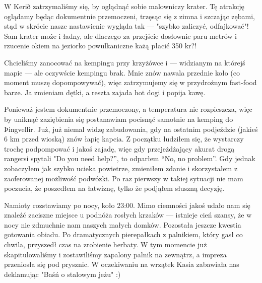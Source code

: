 
W Kerið zatrzymaliśmy się, by oglądnąć sobie malowniczy krater. Tę atrakcję oglądamy będąc dokumentnie przemoczeni, trzęsąc się z zimna i szczając zębami, stąd w skrócie nasze nastawienie wygląda tak --- "szybko zaliczyć, odfajkować"! Sam krater może i ładny, ale dlaczego za przejście dosłownie paru metrów i rzucenie okiem na jeziorko powulkaniczne każą płacić 350 kr?!

Chcieliśmy zanocować na kempingu przy krzyżówce  i  --- widzianym na którejś mapie --- ale oczywście kempingu brak. Mnie znów nawala przednie koło (co moment muszę dopompowywać), więc zatrzymujemy się w przydrożnym fast-food barze. Ja zmieniam dętki, a reszta zajada hot dogi i popija kawę.


Ponieważ jestem dokumentnie przemoczony, a temperatura nie rozpieszcza, więc by uniknąć zaziębienia się postanawiam pocisnąć samotnie na kemping do Þingvellir. Już, już niemal widzę zabudowania, gdy na ostatnim podjeździe (jakieś 6 km przed wioską) znów łapię kapcia. Z początku łudziłem się, że wystarczy trochę podpompować i jakoś zajadę, więc gdy przejeżdżający akurat drogą rangersi spytali "Do you need help?”, to odparłem “No, no problem”. Gdy jednak zobaczyłem jak szybko ucieka powietrze, zmieniłem zdanie i skorzystałem z zaoferowanej możliwość podwózki. Po raz pierwszy w takiej sytuacji nie mam poczucia, że poszedłem na łatwiznę, tylko że podjąłem słuszną decyzję.

Namioty rozstawiamy po nocy, koło 23:00. Mimo ciemności jakoś udało nam się znaleźć zaciszne miejsce u podnóża rosłych krzaków --- istnieje cień szansy, że w nocy nie zdmuchnie nam naszych małych domków. Pozostała jeszcze kwestia gotowania obiadu. Po dramatycznych pierepałkach z palnikiem, który gasł co chwila, przyszedł czas na zrobienie herbaty. W tym momencie już skapitulowaliśmy i zostawiliśmy zapalony palnik na zewnątrz, a impreza przeniosła się pod prysznic. W oczekiwaniu na wrzątek Kasia zabawiała nas deklamując "Baśń o stalowym jeżu" :)

